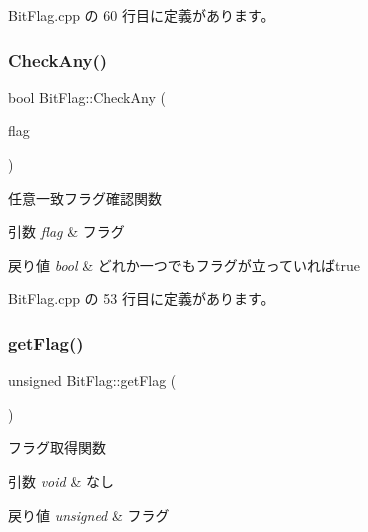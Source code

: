  Bit\+Flag.\+cpp の 60 行目に定義があります。

\mbox{\label{class_bit_flag_a17f2da0c09d9055a14df21ea4cce01f3}} 
\subsubsection{\texorpdfstring{Check\+Any()}{CheckAny()}}
{\footnotesize\ttfamily bool Bit\+Flag\+::\+Check\+Any (\begin{DoxyParamCaption}\item[{unsigned}]{flag }\end{DoxyParamCaption})}



任意一致フラグ確認関数 


\begin{DoxyParams}{引数}
{\em flag} & フラグ \\
\hline
\end{DoxyParams}

\begin{DoxyRetVals}{戻り値}
{\em bool} & どれか一つでもフラグが立っていればtrue \\
\hline
\end{DoxyRetVals}


 Bit\+Flag.\+cpp の 53 行目に定義があります。

\mbox{\label{class_bit_flag_a1d7f83056b377f8f43097bb86b025bee}} 
\subsubsection{\texorpdfstring{get\+Flag()}{getFlag()}}
{\footnotesize\ttfamily unsigned Bit\+Flag\+::get\+Flag (\begin{DoxyParamCaption}{ }\end{DoxyParamCaption})}



フラグ取得関数 


\begin{DoxyParams}{引数}
{\em void} & なし \\
\hline
\end{DoxyParams}

\begin{DoxyRetVals}{戻り値}
{\em unsigned} & フラグ \\
\hline
\end{DoxyRetVals}


